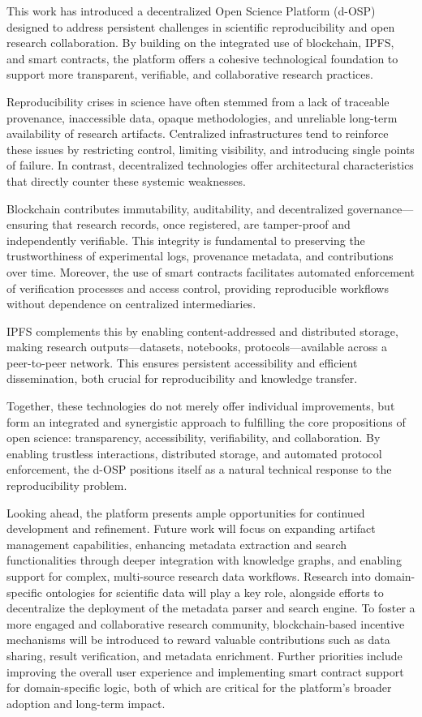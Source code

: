 \documentclass[final]{rc-book-2.14}
\begin{document}
\newpage

This work has introduced a decentralized Open Science Platform (d-OSP) designed to address persistent challenges in scientific reproducibility and open research collaboration. By building on the integrated use of blockchain, IPFS, and smart contracts, the platform offers a cohesive technological foundation to support more transparent, verifiable, and collaborative research practices.

Reproducibility crises in science have often stemmed from a lack of traceable provenance, inaccessible data, opaque methodologies, and unreliable long-term availability of research artifacts. Centralized infrastructures tend to reinforce these issues by restricting control, limiting visibility, and introducing single points of failure. In contrast, decentralized technologies offer architectural characteristics that directly counter these systemic weaknesses.

Blockchain contributes immutability, auditability, and decentralized governance—ensuring that research records, once registered, are tamper-proof and independently verifiable. This integrity is fundamental to preserving the trustworthiness of experimental logs, provenance metadata, and contributions over time. Moreover, the use of smart contracts facilitates automated enforcement of verification processes and access control, providing reproducible workflows without dependence on centralized intermediaries.

IPFS complements this by enabling content-addressed and distributed storage, making research outputs—datasets, notebooks, protocols—available across a peer-to-peer network. This ensures persistent accessibility and efficient dissemination, both crucial for reproducibility and knowledge transfer.

Together, these technologies do not merely offer individual improvements, but form an integrated and synergistic approach to fulfilling the core propositions of open science: transparency, accessibility, verifiability, and collaboration. By enabling trustless interactions, distributed storage, and automated protocol enforcement, the d-OSP positions itself as a natural technical response to the reproducibility problem.

Looking ahead, the platform presents ample opportunities for continued development and refinement. Future work will focus on expanding artifact management capabilities, enhancing metadata extraction and search functionalities through deeper integration with knowledge graphs, and enabling support for complex, multi-source research data workflows. Research into domain-specific ontologies for scientific data will play a key role, alongside efforts to decentralize the deployment of the metadata parser and search engine. To foster a more engaged and collaborative research community, blockchain-based incentive mechanisms will be introduced to reward valuable contributions such as data sharing, result verification, and metadata enrichment. Further priorities include improving the overall user experience and implementing smart contract support for domain-specific logic, both of which are critical for the platform’s broader adoption and long-term impact.
\end{document}
